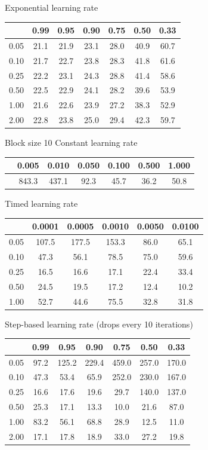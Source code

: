 \documentclass[a4paper,14pt,oneside,openany]{memoir}
\begin{document}
	Exponential learning rate 
	
	\begin{tabular}{|c|c|c|c|c|c|c|}
	\hline 
	 &0.99 &0.95 &0.90 &0.75 &0.50 &0.33 \\
	 \hline 
	0.05 &21.1 &21.9 &23.1 &28.0 &40.9 &60.7 \\
	 \hline 
	0.10 &21.7 &22.7 &23.8 &28.3 &41.8 &61.6 \\
	 \hline 
	0.25 &22.2 &23.1 &24.3 &28.8 &41.4 &58.6 \\
	 \hline 
	0.50 &22.5 &22.9 &24.1 &28.2 &39.6 &53.9 \\
	 \hline 
	1.00 &21.6 &22.6 &23.9 &27.2 &38.3 &52.9 \\
	 \hline 
	2.00 &22.8 &23.8 &25.0 &29.4 &42.3 &59.7 \\
	 \hline 
	
	\end{tabular}
	
	Block size 10 Constant learning rate 
	
	\begin{tabular}{|c|c|c|c|c|c|c|}
	\hline 
	 &0.005 &0.010 &0.050 &0.100 &0.500 &1.000 \\
	 \hline 
	 &843.3 &437.1 &92.3 &45.7 &36.2 &50.8 \\
	 \hline 
	
	\end{tabular}
	
	Timed learning rate 
	
	\begin{tabular}{|c|c|c|c|c|c|}
	\hline 
	 &0.0001 &0.0005 &0.0010 &0.0050 &0.0100 \\
	 \hline 
	0.05 &107.5 &177.5 &153.3 &86.0 &65.1 \\
	 \hline 
	0.10 &47.3 &56.1 &78.5 &75.0 &59.6 \\
	 \hline 
	0.25 &16.5 &16.6 &17.1 &22.4 &33.4 \\
	 \hline 
	0.50 &24.5 &19.5 &17.2 &12.4 &10.2 \\
	 \hline 
	1.00 &52.7 &44.6 &75.5 &32.8 &31.8 \\
	 \hline 
	
	\end{tabular}
	
	Step-based learning rate (drops every 10 iterations) 
	
	\begin{tabular}{|c|c|c|c|c|c|c|}
	\hline 
	 &0.99 &0.95 &0.90 &0.75 &0.50 &0.33 \\
	 \hline 
	0.05 &97.2 &125.2 &229.4 &459.0 &257.0 &170.0 \\
	 \hline 
	0.10 &47.3 &53.4 &65.9 &252.0 &230.0 &167.0 \\
	 \hline 
	0.25 &16.6 &17.6 &19.6 &29.7 &140.0 &137.0 \\
	 \hline 
	0.50 &25.3 &17.1 &13.3 &10.0 &21.6 &87.0 \\
	 \hline 
	1.00 &83.2 &56.1 &68.8 &28.9 &12.5 &11.0 \\
	 \hline 
	2.00 &17.1 &17.8 &18.9 &33.0 &27.2 &19.8 \\
	 \hline 
	
	\end{tabular}
	
\end{document}
